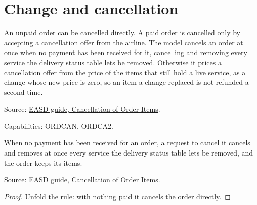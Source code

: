 
\section{Change and cancellation}

\begin{definition}
  \label{def:c15-cancel-order}
  An unpaid order can be cancelled directly.  A paid order is cancelled only by
  accepting a cancellation offer from the airline.  The model cancels an order
  at once when no payment has been received for it, cancelling and removing
  every service the delivery status table lets be removed.  Otherwise it
  prices a cancellation offer from the price of the items that still hold a
  live service, as a change whose new price is zero, so an item a change
  replaced is not refunded a second time.

  Source: \href{https://standards.atlassian.net/wiki/spaces/EASD/pages/574783569/Cancellation+of+Order+Items}{EASD guide, Cancellation of Order Items}.

  Capabilities: ORDCAN, ORDCA2.
\end{definition}

\begin{theorem}
  \label{thm:change-cancellation-unpaid-at-once}
  When no payment has been received for an order, a request to cancel it
  cancels and removes at once every service the delivery status table lets
  be removed, and the order keeps its items.

  Source: \href{https://standards.atlassian.net/wiki/spaces/EASD/pages/574783569/Cancellation+of+Order+Items}{EASD guide, Cancellation of Order Items}.
\end{theorem}
\begin{proof}
  Unfold the rule: with nothing paid it cancels the order directly.
\end{proof}

